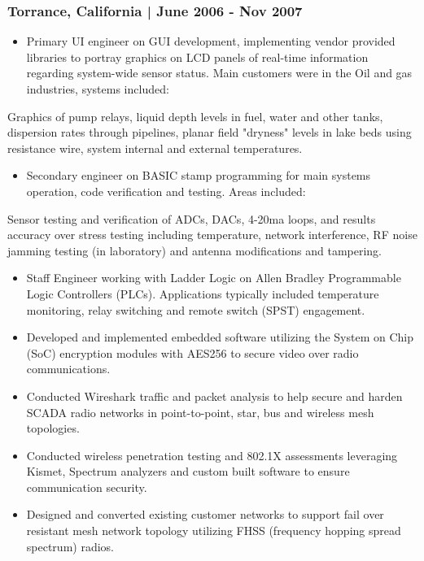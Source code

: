 \documentclass[letter,10pt]{article}
\begin{document}
\subsubsection*{Torrance, California | June 2006 - Nov 2007}
\label{sec:org5066d6a}
\begin{itemize}
\item Primary UI engineer on GUI development, implementing vendor provided libraries to portray graphics on LCD panels of real-time information regarding system-wide sensor status. Main customers were in the Oil and gas industries, systems included:
\end{itemize}
Graphics of pump relays, liquid depth levels in fuel, water and other tanks, dispersion rates through pipelines, planar field "dryness" levels in lake beds using resistance wire, system internal and external temperatures.
\begin{itemize}
\item Secondary engineer on BASIC stamp programming for main systems operation, code verification and testing. Areas included:
\end{itemize}
Sensor testing and verification of ADCs, DACs, 4-20ma loops, and results accuracy over stress testing including temperature, network interference, RF noise jamming testing (in laboratory) and antenna modifications and tampering.
\begin{itemize}
\item Staff Engineer working with Ladder Logic on Allen Bradley Programmable Logic Controllers (PLCs). Applications typically included temperature monitoring, relay switching and remote switch (SPST) engagement.
\item Developed and implemented embedded software utilizing the System on Chip (SoC) encryption modules with AES256 to secure video over radio communications.
\item Conducted Wireshark traffic and packet analysis to help secure and harden SCADA radio networks in point-to-point, star, bus and wireless mesh topologies.
\item Conducted wireless penetration testing and 802.1X assessments leveraging Kismet, Spectrum analyzers and custom built software to ensure communication security.
\item Designed and converted existing customer networks to support fail over resistant mesh network topology utilizing FHSS (frequency hopping spread spectrum) radios.
\end{itemize}
\end{document}
